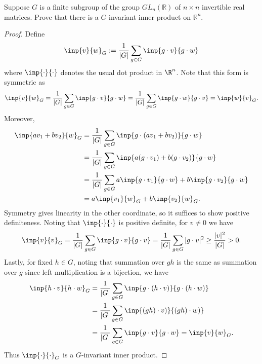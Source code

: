 \documentclass[12pt]{article}
\begin{document}
\begin{homeworkProblem}
Suppose $G$ is a finite subgroup of the group $GL_n(\mathbb{R})$ of $n\times n$ invertible real matrices. Prove that there is a $G$-invariant inner product on $\mathbb{R}^n$.

\begin{proof}
  Define 
  \[
    \inp{v}{w}_{G}:=\frac{1}{|G|}\sum_{g\in G}\inp{g\cdot v}{g\cdot w}
  \]
  where $ \inp{\cdot}{\cdot} $ denotes the usual dot product in $ \R^{n} $. Note that this form is symmetric as 
  \[
    \inp{v}{w}_{G} = \frac{1}{|G|}\sum_{g\in G}\inp{g\cdot v}{g\cdot w} =\frac{1}{|G|}\sum_{g\in G}\inp{g\cdot w}{g\cdot v}  = \inp{w}{v}_{G}.
  \]
  Moreover,
  \begin{align*}
    \inp{av_{1}+bv_{2}}{w}_{G} &= \frac{1}{|G|} \sum_{g\in G}\inp{g\cdot(av_{1}+bv_{2})}{g\cdot w} \\
    &= \frac{1}{|G|} \sum_{g\in G}\inp{a(g\cdot v_{1})+b(g\cdot v_{2})}{g\cdot w}\\
    &= \frac{1}{|G|} \sum_{g\in G} a\inp{g\cdot v_{1}}{g\cdot w} + b\inp{g\cdot v_{2}}{g\cdot w}\\&= a\inp{v_{1}}{w}_{G}+b \inp{v_{2}}{w}_{G}.\\
  \end{align*}
  Symmetry gives linearity in the other coordinate, so it suffices to show positive definiteness. Noting that $ \inp{\cdot}{\cdot} $ is positive definite, for $ v\neq 0 $ we have
  \begin{align*}
    \inp{v}{v}_{G} = \frac{1}{|G|}\sum_{g\in G} \inp{g\cdot v}{g\cdot v} = \frac{1}{|G|} \sum_{g\in G} |g\cdot v|^{2} \geq \frac{|v|^{2}}{|G|}  >0.
  \end{align*}
  Lastly, for fixed $ h\in G $, noting that summation over $ gh $ is the same as summation over $ g $ since left multiplication is a bijection, we have 
  \begin{align*}
    \inp{h\cdot v}{h\cdot w}_{G} &= \frac{1}{|G|}\sum_{g\in G} \inp{g\cdot (h\cdot v)}{g\cdot (h\cdot w)} \\
    &= \frac{1}{|G|}\sum_{g\in G} \inp{(gh)\cdot v)}{(gh)\cdot w)} \\
    &= \frac{1}{|G|}\sum_{g\in G} \inp{g\cdot v}{g\cdot w} = \inp{v}{w}_{G}. 
  \end{align*}
  Thus $ \inp{\cdot}{\cdot}_{G} $ is a $ G $-invariant inner product.

\end{proof}

\end{homeworkProblem}
\end{document}
